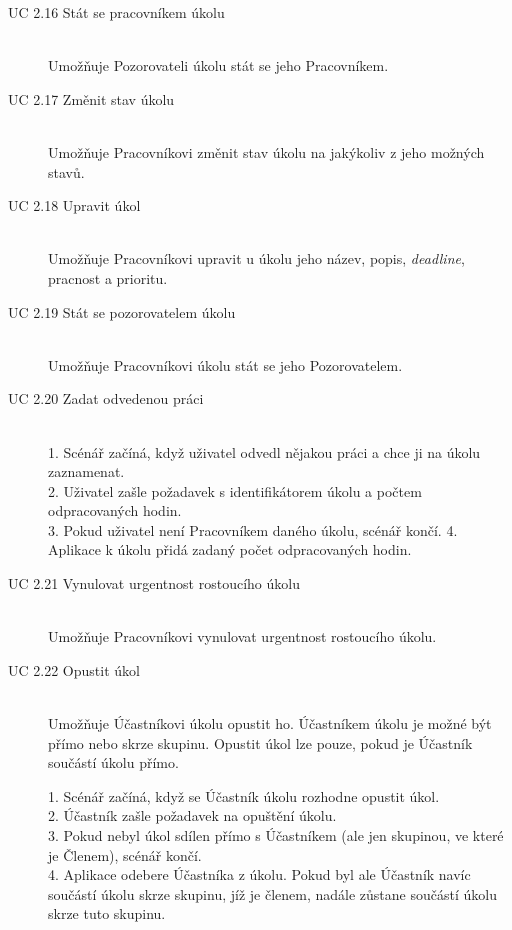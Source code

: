\documentclass[thesis=B,czech]{FITthesis}[2012/06/26]
\begin{document}
\begin{description}
				
				\item[UC 2.16 Stát se pracovníkem úkolu] \hfill \\
					Umožňuje Pozorovateli úkolu stát se jeho Pracovníkem.				
								
				\item[UC 2.17 Změnit stav úkolu] \hfill \\
					Umožňuje Pracovníkovi změnit stav úkolu na jakýkoliv z jeho možných stavů.
				
				\item[UC 2.18 Upravit úkol] \hfill \\
					Umožňuje Pracovníkovi upravit u úkolu jeho název, popis, \textit{deadline}, pracnost a prioritu.
				
				\item[UC 2.19 Stát se pozorovatelem úkolu] \hfill \\
					Umožňuje Pracovníkovi úkolu stát se jeho Pozorovatelem.
					
				\item[UC 2.20 Zadat odvedenou práci] \hfill \\
					1. Scénář začíná, když uživatel odvedl nějakou práci a chce ji na úkolu zaznamenat. \\
					2. Uživatel zašle požadavek s identifikátorem úkolu a počtem odpracovaných hodin. \\
					3. Pokud uživatel není Pracovníkem daného úkolu, scénář končí.
					4. Aplikace k úkolu přidá zadaný počet odpracovaných hodin. \\
					
				\item[UC 2.21 Vynulovat urgentnost rostoucího úkolu] \hfill \\
					Umožňuje Pracovníkovi vynulovat urgentnost rostoucího úkolu.
					
				\item[UC 2.22 Opustit úkol] \hfill \\
					Umožňuje Účastníkovi úkolu opustit ho. Účastníkem úkolu je možné být přímo nebo skrze skupinu. Opustit úkol lze pouze, pokud je Účastník součástí úkolu přímo.
				
					1. Scénář začíná, když se Účastník úkolu rozhodne opustit úkol. \\
					2. Účastník zašle požadavek na opuštění úkolu. \\
					3. Pokud nebyl úkol sdílen přímo s Účastníkem (ale jen skupinou, ve které je Členem), scénář končí. \\
					4. Aplikace odebere Účastníka z úkolu. Pokud byl ale Účastník navíc součástí úkolu skrze skupinu, jíž je členem, nadále zůstane součástí úkolu skrze tuto skupinu.
			\end{description}
			
\end{document}
